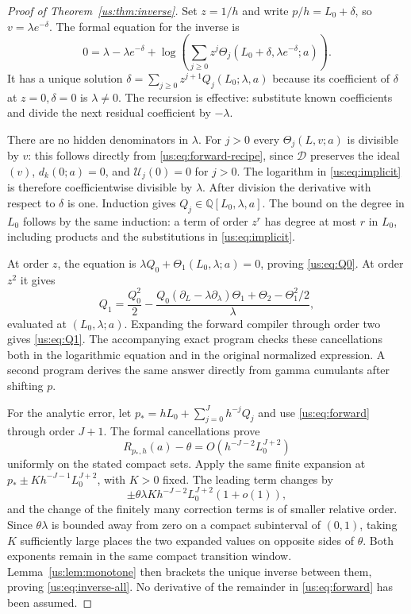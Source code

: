 \documentclass[11pt,a4paper]{article}
\numberwithin{equation}{section}
\theoremstyle{plain}
\theoremstyle{definition}
\theoremstyle{remark}
\begin{document}
\begin{proof}[Proof of Theorem~\ref{us:thm:inverse}]
Set $z=1/h$ and write $p/h=L_0+\delta$, so $v=\lambda e^{-\delta}$.
The formal equation for the inverse is
\begin{equation}\label{us:eq:implicit}
 0=\lambda-\lambda e^{-\delta}
   +\log\!\left(
        \sum_{j\ge0}z^j
          \Theta_j(L_0+\delta,\lambda e^{-\delta};a)\right).
\end{equation}
It has a unique solution
$\delta=\sum_{j\ge0}z^{j+1}Q_j(L_0;\lambda,a)$ because its
coefficient of $\delta$ at $z=0,\delta=0$ is $\lambda\ne0$.
The recursion is effective: substitute known coefficients and divide
the next residual coefficient by $-\lambda$.

There are no hidden denominators in $\lambda$. For $j>0$ every
$\Theta_j(L,v;a)$ is divisible by $v$: this follows directly
from \eqref{us:eq:forward-recipe}, since $\mathcal D$ preserves
the ideal $(v)$, $d_k(0;a)=0$, and $\mathcal U_j(0)=0$ for $j>0$.
The logarithm in
\eqref{us:eq:implicit} is therefore coefficientwise divisible by
$\lambda$. After division the derivative with respect to $\delta$
is one. Induction gives $Q_j\in\mathbb Q[L_0,\lambda,a]$.
The bound on the degree in $L_0$ follows by the same induction:
a term of order $z^r$ has degree at most $r$ in $L_0$, including
products and the substitutions in \eqref{us:eq:implicit}.

At order $z$, the equation is
$\lambda Q_0+\Theta_1(L_0,\lambda;a)=0$, proving
\eqref{us:eq:Q0}. At order $z^2$ it gives
\[
 Q_1=\frac{Q_0^2}{2}
  -\frac{
     Q_0(\partial_L-\lambda\partial_\lambda)\Theta_1
       +\Theta_2-\Theta_1^2/2}{\lambda},
\]
evaluated at $(L_0,\lambda;a)$. Expanding the forward compiler
through order two gives \eqref{us:eq:Q1}. The accompanying exact
program checks these cancellations both in the logarithmic equation
and in the original normalized expression. A second program derives
the same answer directly from gamma cumulants after shifting $p$.

For the analytic error, let
$p_* = hL_0+\sum_{j=0}^Jh^{-j}Q_j$ and use
\eqref{us:eq:forward} through order $J+1$. The formal
cancellations prove
\[
 R_{p_*,h}(a)-\theta
 =O\!\left(h^{-J-2}L_0^{J+2}\right)
\]
uniformly on the stated compact sets. Apply the same finite expansion
at $p_*\pm K h^{-J-1}L_0^{J+2}$, with $K>0$ fixed.
The leading term changes by
\[
 \pm\theta\lambda K h^{-J-2}L_0^{J+2}(1+o(1)),
\]
and the change of the finitely many correction terms is of smaller
relative order. Since $\theta\lambda$ is bounded away from zero
on a compact subinterval of $(0,1)$, taking $K$ sufficiently large
places the two expanded values on opposite sides of $\theta$.
Both exponents remain in the same compact transition window.
Lemma~\ref{us:lem:monotone} then brackets the unique inverse
between them, proving \eqref{us:eq:inverse-all}. No derivative of
the remainder in \eqref{us:eq:forward} has been assumed.
\end{proof}
\end{document}
